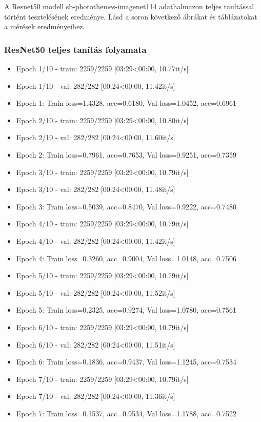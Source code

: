 A Resnet50 modell sb-photothemes-imagenet114 adathalmazon teljes tanítással történt tesztelésének eredménye. Lásd a soron következő ábrákat és táblázatokat a mérések eredményeihez.
\subsubsection{ResNet50 teljes tanítás folyamata}
\begin{itemize} 
	\item Epoch 1/10 - train: 2259/2259 [03:29<00:00, 10.77it/s]
	\item Epoch 1/10 - val: 282/282 [00:24<00:00, 11.42it/s]
	\item Epoch 1: Train loss=1.4328, acc=0.6180, Val loss=1.0452, acc=0.6961
	\item Epoch 2/10 - train: 2259/2259 [03:29<00:00, 10.80it/s]
	\item Epoch 2/10 - val: 282/282 [00:24<00:00, 11.60it/s]
	\item Epoch 2: Train loss=0.7961, acc=0.7653, Val loss=0.9251, acc=0.7359
	\item Epoch 3/10 - train: 2259/2259 [03:29<00:00, 10.79it/s]
	\item Epoch 3/10 - val: 282/282 [00:24<00:00, 11.48it/s]
	\item Epoch 3: Train loss=0.5039, acc=0.8470, Val loss=0.9222, acc=0.7480
	\item Epoch 4/10 - train: 2259/2259 [03:29<00:00, 10.79it/s]
	\item Epoch 4/10 - val: 282/282 [00:24<00:00, 11.42it/s]
	\item Epoch 4: Train loss=0.3260, acc=0.9004, Val loss=1.0148, acc=0.7506
	\item Epoch 5/10 - train: 2259/2259 [03:29<00:00, 10.79it/s]
	\item Epoch 5/10 - val: 282/282 [00:24<00:00, 11.52it/s]
	\item Epoch 5: Train loss=0.2325, acc=0.9274, Val loss=1.0780, acc=0.7561
	\item Epoch 6/10 - train: 2259/2259 [03:29<00:00, 10.79it/s]
	\item Epoch 6/10 - val: 282/282 [00:24<00:00, 11.51it/s]
	\item Epoch 6: Train loss=0.1836, acc=0.9437, Val loss=1.1245, acc=0.7534
	\item Epoch 7/10 - train: 2259/2259 [03:29<00:00, 10.79it/s]
	\item Epoch 7/10 - val: 282/282 [00:24<00:00, 11.36it/s]
	\item Epoch 7: Train loss=0.1537, acc=0.9534, Val loss=1.1788, acc=0.7522

\end{itemize}
